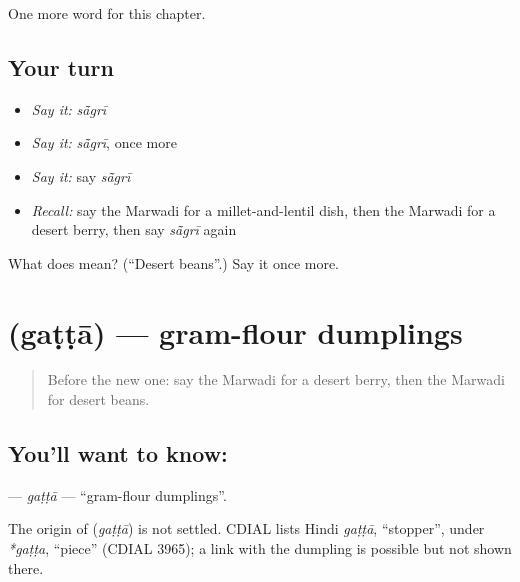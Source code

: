 \begin{grammarlens}[title={What you've built}]
One more word for this chapter.
\end{grammarlens}

\subsection*{Your turn}
\begin{itemize}
\raggedright
  \item \emph{Say it:} \emph{sā̃grī}
  \item \emph{Say it:} \emph{sā̃grī}, once more
  \item \emph{Say it:} say \emph{sā̃grī}
  \item \emph{Recall:} say the Marwadi for a millet-and-lentil dish, then the Marwadi for a desert berry, then say \emph{sā̃grī} again
\end{itemize}

\begin{tcolorbox}[breakable,colback=teal!4,colframe=teal!35!black,title={Before you move on}]
What does  mean? (\textquotedblleft{}Desert beans\textquotedblright{}.) Say it once more.
\end{tcolorbox}
\section[\texorpdfstring{\mw{गट्टा} (gaṭṭā)}{गट्टा (gaṭṭā)}]{ (gaṭṭā) — gram-flour dumplings}

\label{lesson:MW-C131-gatta}



\begin{quote}
Before the new one: say the Marwadi for a desert berry, then the Marwadi for desert beans.
\end{quote}

\subsection*{You'll want to know: }
\textbf{} — \emph{gaṭṭā} — \textquotedblleft{}gram-flour dumplings\textquotedblright{}.

\begin{cousinweb}
The origin of \textbf{} (\emph{gaṭṭā}) is not settled. CDIAL lists Hindi \emph{gaṭṭā}, \textquotedblleft{}stopper\textquotedblright{}, under \emph{*gaṭṭa}, \textquotedblleft{}piece\textquotedblright{} (CDIAL 3965); a link with the dumpling is possible but not shown there.
\end{cousinweb}

